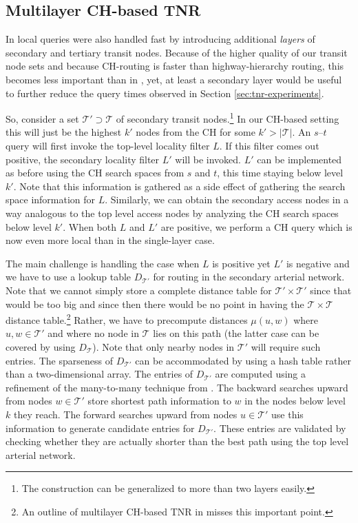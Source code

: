 \documentclass{llncs}
\begin{document}
\subsection{Multilayer CH-based TNR}

In \cite{bfmss-itcsp-07,s-rprn-08} local queries were also handled fast by introducing additional \emph{layers} of secondary and tertiary transit nodes. Because of the higher quality of our transit node sets and because CH-routing is faster than highway-hierarchy routing, this becomes less important than in \cite{bfmss-itcsp-07}, yet, at least a secondary layer would be useful to further reduce the query times observed in Section \ref{sec:tnr-experiments}.

So, consider a set $\mathcal{T'}\supset\mathcal{T}$ of secondary transit nodes.\footnote{The construction can be generalized to more than two layers easily.} 
In our CH-based setting this will just be the highest $k'$ nodes from the CH for some $k'>|\mathcal{T}|$.
An $s$--$t$ query will first invoke the top-level locality filter $L$. If this filter comes out positive, the secondary locality filter $L'$ will be invoked.
$L'$ can be implemented as before using the CH search spaces from $s$ and $t$, this time staying below level $k'$. Note that this information is gathered as a side effect of gathering the search space information for $L$.
Similarly, we can obtain the secondary access nodes in a way analogous to the
top level access nodes by analyzing the CH search spaces below level $k'$.
When both $L$ and $L'$ are positive, we perform a CH query which 
is now even more local than in the single-layer case.

The main challenge is handling the case when $L$ is positive yet $L'$ is negative and we have to use a lookup table $D_{\mathcal{T}'}$ for routing in the secondary arterial network. Note that we cannot simply store a complete distance table for $\mathcal{T'}\times\mathcal{T'}$ since that would be too big and since then there would be no point in having the $\mathcal{T}\times\mathcal{T}$ distance table.\footnote{An outline of multilayer CH-based TNR in \cite{Bast11} misses this important point.} Rather, we have to precompute distances $\mu(u,w)$ where $u,w\in\mathcal{T}'$ and where no node in $\mathcal{T}$ lies on this path (the latter case can be covered by using $D_{\mathcal{T}}$). Note that only nearby nodes in $\mathcal{T}'$ will require such entries. The sparseness of $D_{\mathcal{T}'}$ can be accommodated by using a hash table rather than a two-dimensional array.  The entries of $D_{\mathcal{T}'}$ are computed using a refinement of the many-to-many technique from \cite{ksssw-cmmsp-07,gssv-erlrn-12}. The backward searches upward from nodes $w\in\mathcal{T'}$ store shortest path information to $w$ in the nodes below level $k$ they reach. The forward searches upward from nodes $u\in\mathcal{T'}$ use this information to generate candidate entries for $D_{\mathcal{T}'}$.  These entries are validated by checking whether they are actually shorter than the best path using the top level arterial network.
\end{document}
